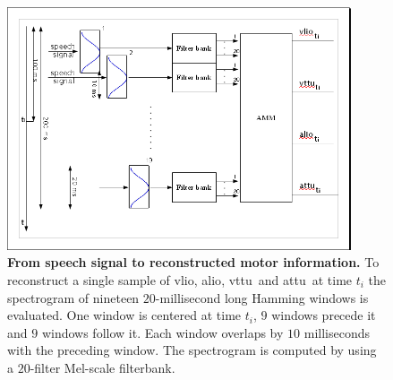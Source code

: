 \documentclass[10pt]{article}
\newcommand{\vlio}{\textsf{vlio}}
\newcommand{\vttu}{\textsf{vttu}}
\newcommand{\alio}{\textsf{alio}}
\newcommand{\attu}{\textsf{attu}}
\begin{document}
\begin{figure}[t]
\begin{center}
\includegraphics[width=4in]{figs/audio2motor}
\end{center}
\caption{{\bf From speech signal to reconstructed motor information.} To reconstruct
a single sample of \vlio, \alio, \vttu\ and \attu\ at time $t_i$ the
spectrogram of nineteen $20$-millisecond long Hamming windows is evaluated.
One window is centered at time $t_i$, $9$ windows precede it
and $9$ windows follow it. Each window overlaps by $10$ milliseconds
with the preceding window. The spectrogram is computed by using a
$20$-filter Mel-scale filterbank.}
\label{fig:amm}
\end{figure}





\end{document}
